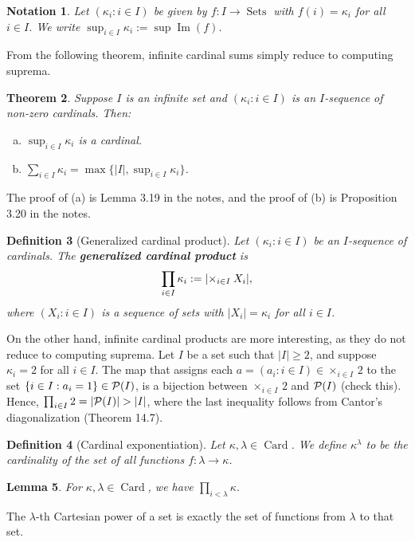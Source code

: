 \documentclass[10pt]{article}
\makeatletter
\DeclareMathOperator{\im}{Im}
\DeclareMathOperator{\Sets}{Sets}
\DeclareMathOperator{\Card}{Card}
\theoremstyle{newstyle}
\newtheorem{thm}{Theorem}[section]
\newtheorem{lemma}[thm]{Lemma}
\newtheorem{defn}[thm]{Definition}
\newtheorem{notation}[thm]{Notation}
\newenvironment{pf}[1][\proofname]{\par
  \pushQED{\qed}%
  \normalfont \topsep0\p@\relax
  \trivlist
  \item[\hskip\labelsep\scshape
  #1\@addpunct{.}]\ignorespaces
}{%
  \popQED\endtrivlist\@endpefalse
}
\makeatother
\begin{document}
\begin{notation}
Let $(\kappa_i : i \in I)$ be given by $f : I \to \Sets$ with $f(i) = \kappa_i$ for all 
$i \in I$. We write $\sup_{i\in I} \kappa_i := \sup \im(f)$.
\end{notation}

From the following theorem, infinite cardinal sums simply reduce to computing suprema.

\begin{thm} 
Suppose $I$ is an infinite set and $(\kappa_i : i \in I)$ is an $I$-sequence of non-zero cardinals. 
Then:
\begin{enumerate}[(a)]
    \item $\sup_{i \in I} \kappa_i$ is a cardinal. 
    \item $\sum_{i\in I} \kappa_i = \max\{|I|, \sup_{i\in I} \kappa_i\}$.
\end{enumerate}
\end{thm}
\begin{pf}
The proof of (a) is Lemma 3.19 in the notes, and the proof of (b) is Proposition 3.20 in the notes.
\end{pf}

\begin{defn}[Generalized cardinal product]
Let $(\kappa_i : i \in I)$ be an $I$-sequence of cardinals. The {\bf generalized cardinal product} is 
\[ \prod_{i\in I} \kappa_i := |\hspace{-0.5ex}\times_{i\in I} X_i|, \]
where $(X_i : i \in I)$ is a sequence of sets with $|X_i| = \kappa_i$ for all $i \in I$.
\end{defn}

On the other hand, infinite cardinal products are more interesting, as they do not reduce to 
computing suprema. Let $I$ be a set such that $|I| \geq 2$, and suppose $\kappa_i = 2$
for all $i \in I$. The map that assigns each $a = (a_i : i \in I) \in \times_{i \in I} \, 2$ 
to the set $\{i \in I : a_i = 1\} \in {\cal P}(I)$, is a bijection 
between $\times_{i \in I} \, 2$ and ${\cal P}(I)$ (check this). Hence, 
$\prod_{i\in I} 2 = |{\cal P}(I)| > |I|$, where the last inequality follows from 
Cantor's diagonalization (Theorem 14.7).

\begin{defn}[Cardinal exponentiation] 
Let $\kappa, \lambda \in \Card$. We define $\kappa^\lambda$ to be the 
cardinality of the set of all functions $f : \lambda \to \kappa$. 
\end{defn}

\begin{lemma} 
For $\kappa, \lambda \in \Card$, we have $\prod_{i<\lambda} \kappa$. 
\end{lemma}
\begin{pf}
The $\lambda$-th Cartesian power of a set is exactly the set of functions from 
$\lambda$ to that set. 
\end{pf}
\end{document}
